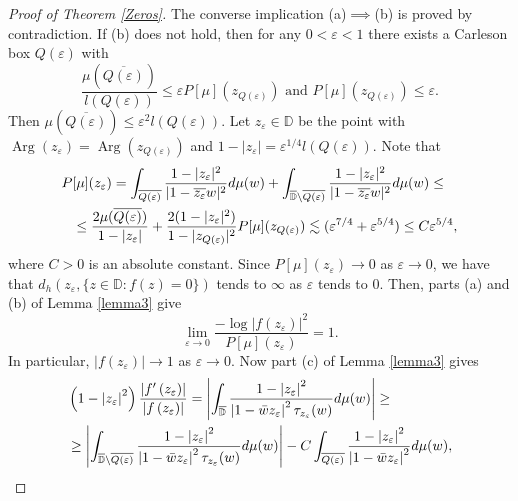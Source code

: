 \documentclass[a4paper,12pt]{article}
\theoremstyle{definition}
\numberwithin{equation}{section}
\newcommand{\D}{\mathbb D}
\begin{document}
\begin{proof}[Proof of Theorem \ref{Zeros}]
The converse implication (a)$\implies$(b) is proved by contradiction. If (b) does not hold, then for any $0 < \varepsilon < 1$ there exists a Carleson box $Q (\varepsilon)$ with
\begin{equation}
    \label{assum}
    \frac{\mu(\overline{Q(\varepsilon)})}{l(Q(\varepsilon))} \leq \varepsilon P[\mu]\left(z_{Q(\varepsilon)}\right) \text { and } P[\mu]\left(z_{Q(\varepsilon)}\right) \leq \varepsilon . 
\end{equation}
Then $ \mu (\overline{Q(\varepsilon)}) \leq \varepsilon^2 l (Q(\varepsilon))$. Let $z_\varepsilon \in \D$ be the point with $\operatorname{Arg} (z_\varepsilon ) = \operatorname{Arg} (z_{Q(\varepsilon)})$ and $1 - |z_\varepsilon| = \varepsilon^{1/4} l (Q(\varepsilon))$. Note that 
\begin{align}
P & [\mu] (z_\varepsilon)  = \int_{\overline{Q(\varepsilon)}} \frac{1-|z_\varepsilon|^2}{|1 - \overline{z_\varepsilon} w|^2} d\mu (w) + \int_{\overline{\mathbb{D}} \setminus \overline{Q(\varepsilon)}} \frac{1-|z_\varepsilon|^2}{|1 - \overline{z_\varepsilon} w|^2} d\mu (w) \leq \\\ 
 & \notag \leq \frac{2\mu(\overline{Q(\varepsilon)})}{1- |z_\varepsilon|} + \frac{2(1-|z_\varepsilon|^2)}{1-|z_{Q(\varepsilon)}|^2} P[\mu] (z_{Q(\varepsilon)}) \lesssim (\varepsilon^{7/4} + \varepsilon^{5/4} ) \leq C \varepsilon^{5/4} , 
\end{align}
where $C>0$ is an absolute constant. Since $P[\mu] (z_\varepsilon) \to 0$ as $\varepsilon \to 0$, we have that $d_h (z_\varepsilon, \{z \in \D : f(z)= 0 \})$ tends to $\infty$ as $\varepsilon $ tends to $0$. Then, parts (a) and (b) of Lemma \ref{lemma3} give  
\begin{equation}
    \label{zeros2}
  \lim_{\varepsilon \to 0}  \frac{ - \log |f(z_\varepsilon)|^2}{ P[\mu] (z_\varepsilon)} = 1 . 
\end{equation}
In particular, $|f(z_\varepsilon)| \to 1$ as $\varepsilon \to 0$. Now part (c) of Lemma \ref{lemma3} gives 
\begin{align}
    \label{1}
&    \left(1-\left|z_{\varepsilon}\right|^{2}\right) \frac{\left|f^{\prime}\left(z_{\varepsilon}\right)\right|}{\left|f\left(z_{\varepsilon}\right)\right|}=\left|\int_{\overline{\D} } \frac{1-\left|z_{\varepsilon}\right|^{2}}{\left|1-\bar{w} z_\varepsilon \right|^{2} \tau_{z_\varepsilon} (w)} d \mu(w)\right| \geq \\
& \geq \notag \left|\int_{\overline{\D}\setminus \overline{Q(\varepsilon)}} \frac{1-\left|z_{\varepsilon}\right|^{2}}{\left|1-\bar{w} z_\varepsilon \right|^{2} \tau_{z_\varepsilon} (w)} d \mu(w)\right| - C \int_{\overline{Q(\varepsilon)} } \frac{1-\left|z_{\varepsilon} \right|^{2}}{\left|1-\bar{w} z_\varepsilon \right|^{2}} d \mu(w),

\end{align}
\end{proof}
\end{document}

